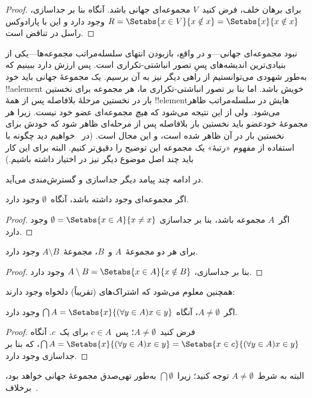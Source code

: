 \documentclass[../../../include/open-logic-section]{subfiles}
\begin{document}
\begin{proof}
برای برهان خلف، فرض کنید~$V$ مجموعه‌ای جهانی باشد. آنگاه بنا بر جداسازی،
$R = \Setabs{x \in V}{x \notin x} = \Setabs{x}{x \notin x}$ وجود دارد
و این با پارادوکس راسل در تناقض است.
\end{proof}

نبود مجموعه‌ای جهانی---و در واقع، بازبودن انتهای سلسله‌مراتب
مجموعه‌ها---یکی از بنیادی‌ترین اندیشه‌های پسِ تصور انباشتی-تکراری است.
پس ارزش دارد ببینیم که به‌طور شهودی می‌توانستیم از راهی دیگر نیز به آن
برسیم. یک مجموعهٔ جهانی باید خود !!a{element} خویش باشد. اما بنا بر تصور
انباشتی-تکراری ما، هر مجموعه برای نخستین بار در نخستین مرحلهٔ بلافاصله پس
از همهٔ !!{element}هایش در سلسله‌مراتب ظاهر می‌شود. ولی از این نتیجه
می‌شود که \emph{هیچ} مجموعه‌ای عضو خود نیست. زیرا هر مجموعهٔ خودعضو باید
نخستین بار بلافاصله پس از مرحله‌ای ظاهر شود که خودش برای نخستین بار در آن
ظاهر شده است، و این محال است. (در~
خواهیم دید چگونه با استفاده از مفهوم «رتبهٔ» یک مجموعه این توضیح را
دقیق‌تر کنیم. البته برای این کار باید چند اصل موضوع دیگر نیز در اختیار
داشته باشیم.)

در ادامه چند پیامد دیگر جداسازی و گسترش‌مندی می‌آید.

\begin{prop}
اگر مجموعه‌ای وجود داشته باشد، آنگاه~$\emptyset$ وجود دارد.
\end{prop}

\begin{proof}
اگر~$A$ مجموعه باشد، بنا بر جداسازی
$\emptyset = \Setabs{x \in A}{x \neq x}$ وجود دارد.
\end{proof}

\begin{prop}
برای هر دو مجموعهٔ~$A$ و~$B$، مجموعهٔ~$A \setminus B$ وجود دارد.
\end{prop}

\begin{proof}
بنا بر جداسازی، $A \setminus B = \Setabs{x \in A}{x \notin B}$ وجود دارد.
\end{proof}

همچنین معلوم می‌شود که اشتراک‌های (تقریباً) دلخواه وجود دارند:

\begin{prop}
اگر~$A \neq \emptyset$، آنگاه
$\bigcap A = \Setabs{x}{(\forall y \in A)x \in y}$ وجود دارد.
\end{prop}

\begin{proof}
فرض کنید~$A \neq \emptyset$؛ پس~$c \in A$ برای یک~$c$. آنگاه
$\bigcap A = \Setabs{x}{(\forall y \in A)x \in y} =
\Setabs{x \in c}{(\forall y \in A)x \in y}$، که بنا بر جداسازی وجود دارد.
\end{proof}

البته به شرط~$A \neq \emptyset$ توجه کنید؛ زیرا~$\bigcap \emptyset$ به‌طور
تهی‌صدق مجموعهٔ جهانی خواهد بود، برخلاف~.
\end{document}
